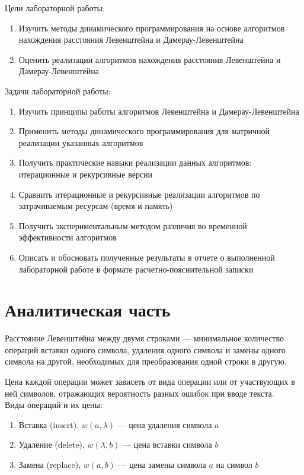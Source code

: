 \documentclass[12pt]{report}
\begin{document}
    Цели лабораторной работы:
    \begin{enumerate}
        \item Изучить методы динамического программирования на основе алгоритмов нахождения расстояния
        Левенштейна и Дамерау-Левенштейна
        \item Оценить реализации алгоритмов нахождения расстояния Левенштейна и Дамерау-Левенштейна
    \end{enumerate}

    Задачи лабораторной работы:
    \begin{enumerate}
        \item Изучить принципы работы алгоритмов Левенштейна и Дамерау-Левенштейна
        \item Применить методы динамического программирования для матричной реализации указанных алгоритмов
        \item Получить практические навыки реализации данных алгоритмов: итерационные и рекурсивные версии
        \item Сравнить итерационные и рекурсивные реализации алгоритмов по затрачиваемым ресурсам (время и память)
        \item Получить экспериментальным методом различия во временной эффективности алгоритмов
        \item Описать и обосновать полученные результаты в отчете о выполненной лабораторной работе
        в формате расчетно-пояснительной записки
    \end{enumerate}

    \newpage


    \chapter{Аналитическая часть}

    Расстояние Левенштейна \cite{Levenshtein} между двумя строками ---
    минимальное количество операций вставки одного символа, удаления одного символа
    и замены одного символа на другой, необходимых для преобразования одной строки в другую.

    Цена каждой операции может зависеть от вида операции или от участвующих в ней символов, отражающих вероятность
    разных ошибок при вводе текста.
    \\
    Виды операций и их цены:
    \begin{enumerate}
        \item Вставка (insert), $w(a,\lambda)$ --- цена удаления символа $a$
        \item Удаление (delete), $w(\lambda, b)$ --- цена вставки символа $b$
        \item Замена (replace), $w(a, b)$ --- цена замены символа $a$ на символ $b$
    \end{enumerate}
\end{document}
